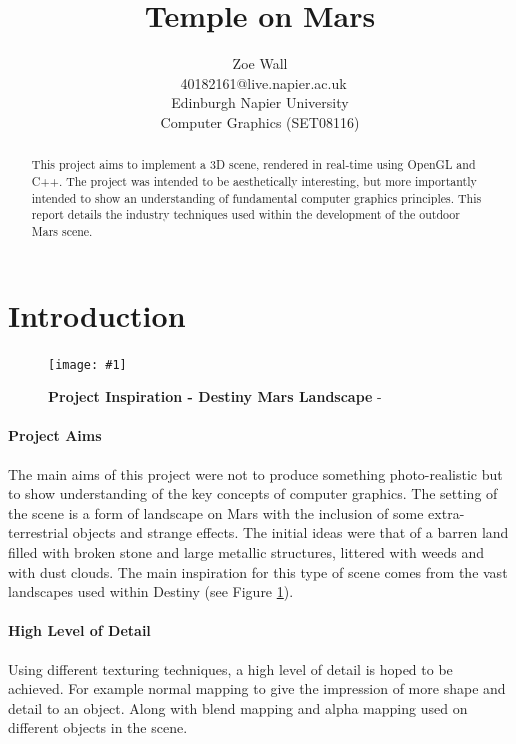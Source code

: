 \documentclass[conference]{acmsiggraph}
\title{Temple on Mars}
\author{Zoe Wall \\\ 40182161@live.napier.ac.uk \\
Edinburgh Napier University \\
Computer Graphics (SET08116)}
\newcommand{\figuremacroW}[4]{
\begin{figure}[h] %
	\centering
	\texttt{[image: \#1]}
	\caption[#2]{\textbf{#2} - #3}
	\label{fig:#1}
\end{figure}
}
\begin{document}
	
	
\maketitle
	
\begin{abstract}
	This project aims to implement a 3D scene, rendered in real-time using OpenGL and C++. The project was intended to be aesthetically interesting, but more importantly intended to show an understanding of fundamental computer graphics principles. This report details the industry techniques used within the development of the outdoor Mars scene.
\end{abstract}
	
\keywordlist
	
\section{Introduction}
	
\figuremacroW
{DestinyMars1}
{Project Inspiration - Destiny Mars Landscape}
{\protect\cite{Destiny}}
{1.0}
	
\paragraph{Project Aims}The main aims of this project were not to produce something photo-realistic but to show understanding of the key concepts of computer graphics. The setting of the scene is a form of landscape on Mars with the inclusion of some extra-terrestrial objects and strange effects. The initial ideas were that of a barren land filled with broken stone and large metallic structures, littered with weeds and with dust clouds. The main inspiration for this type of scene comes from the vast landscapes used within Destiny (see Figure \ref{fig:DestinyMars1}).
	
\paragraph{High Level of Detail} Using different texturing techniques, a high level of detail is hoped to be achieved. For example normal mapping to give the impression of more shape and detail to an object. Along with blend mapping and alpha mapping used on different objects in the scene.
	
\end{document}
